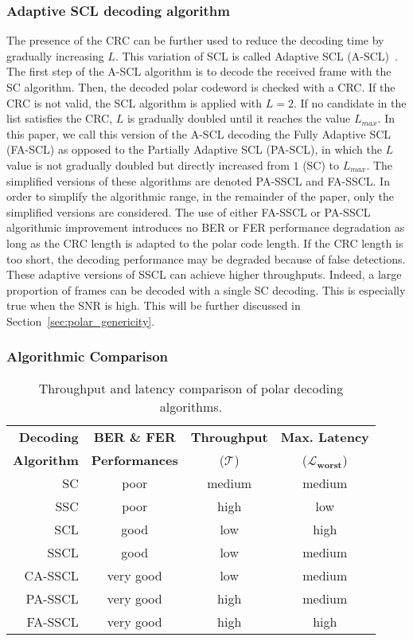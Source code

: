 \subsubsection{Adaptive SCL decoding algorithm}

The presence of the CRC can be further used to reduce the decoding time by
gradually increasing $L$. This variation of SCL is called Adaptive SCL
(A-SCL)~\cite{Li2012}. The first step of the A-SCL algorithm is to decode the
received frame with the SC algorithm. Then, the decoded polar codeword is
checked with a CRC. If the CRC is not valid, the SCL algorithm is applied with
$L=2$. If no candidate in the list satisfies the CRC, $L$ is gradually doubled
until it reaches the value $L_{max}$. In this paper, we call this version of the
A-SCL decoding the Fully Adaptive SCL (FA-SCL) as opposed to the Partially
Adaptive SCL (PA-SCL), in which the $L$ value is not gradually doubled but
directly increased from $1$ (SC) to $L_{max}$. The simplified versions of these
algorithms are denoted PA-SSCL and FA-SSCL. In order to simplify the algorithmic
range, in the remainder of the paper, only the simplified versions are
considered. The use of either FA-SSCL or PA-SSCL algorithmic improvement
introduces no BER or FER performance degradation as long as the CRC length is
adapted to the polar code length. If the CRC length is too short, the decoding
performance may be degraded because of false detections. These adaptive versions
of SSCL can achieve higher throughputs. Indeed, a large proportion of frames can
be decoded with a single SC decoding. This is especially true when the SNR is
high. This will be further discussed in Section~\ref{sec:polar_genericity}.

\subsubsection{Algorithmic Comparison}

\begin{table}[htp]
  \centering
  \caption{Throughput and latency comparison of polar decoding algorithms.}
  \label{tab:polar_algos}
   \begin{tabular}{r c c c}
    \textbf{Decoding}  & \textbf{BER \& FER}   & \multirow{1}{*}{\textbf{Throughput}} & \textbf{Max. Latency}        \\
    \textbf{Algorithm} & \textbf{Performances} & ($\bm{\mathcal{T}}$)                 & ($\bm{\mathcal{L}_{worst}}$) \\
    \hline
    \hline
    SC      & poor      & medium & medium \\
    SSC     & poor      & high   & low    \\
    SCL     & good      & low    & high   \\
    SSCL    & good      & low    & medium \\
    CA-SSCL & very good & low    & medium \\
    PA-SSCL & very good & high   & medium \\
    FA-SSCL & very good & high   & high   \\
  \end{tabular}
\end{table}


